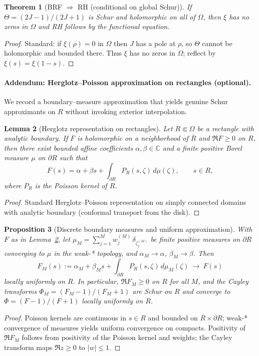 \documentclass[11pt]{article}
\newtheorem{theorem}{Theorem}
\newtheorem{proposition}[theorem]{Proposition}
\newtheorem{lemma}[theorem]{Lemma}
\theoremstyle{remark}
\newcommand{\C}{\mathbb{C}}
\begin{document}
\begin{theorem}[BRF \(\Rightarrow\) RH (conditional on global Schur)]\label{thm:brf-rh-final}
If \(\Theta=(2J-1)/(2J+1)\) is Schur and holomorphic on all of \(\Omega\), then \(\xi\) has no zeros in \(\Omega\) and RH follows by the functional equation.
\end{theorem}
\begin{proof}
Standard: if \(\xi(\rho)=0\) in \(\Omega\) then \(J\) has a pole at \(\rho\), so \(\Theta\) cannot be holomorphic and bounded there. Thus \(\xi\) has no zeros in \(\Omega\); reflect by \(\xi(s)=\xi(1-s)\).
\end{proof}

\paragraph{Addendum: Herglotz--Poisson approximation on rectangles (optional).}
We record a boundary--measure approximation that yields genuine Schur approximants on \(R\) without invoking exterior interpolation.

\begin{lemma}[Herglotz representation on rectangles]\label{lem:herglotz-rect}
Let \(R\Subset\Omega\) be a rectangle with analytic boundary. If \(F\) is holomorphic on a neighborhood of \(\overline R\) and \(\Re F\ge 0\) on \(R\), then there exist bounded affine coefficients \(\alpha,\beta\in\C\) and a finite positive Borel measure \(\mu\) on \(\partial R\) such that
\[F(s)=\alpha+\beta s+\int_{\partial R} P_R(s,\zeta)\,d\mu(\zeta),\qquad s\in R,\]
where \(P_R\) is the Poisson kernel of \(R\).
\end{lemma}
\begin{proof}
Standard Herglotz--Poisson representation on simply connected domains with analytic boundary (conformal transport from the disk).
\end{proof}

\begin{proposition}[Discrete boundary measures and uniform approximation]\label{prop:discrete-Poisson}
With \(F\) as in Lemma~\ref{lem:herglotz-rect}, let \(\mu_M=\sum_{j=1}^{M} w_j^{(M)}\,\delta_{\zeta_j^{(M)}}\) be finite positive measures on \(\partial R\) converging to \(\mu\) in the weak-* topology, and \(\alpha_M\to\alpha\), \(\beta_M\to\beta\). Then
\[F_M(s):=\alpha_M+\beta_M s+\int_{\partial R} P_R(s,\zeta)\,d\mu_M(\zeta)\ \to\ F(s)\]
locally uniformly on \(R\). In particular, \(\Re F_M\ge 0\) on \(R\) for all \(M\), and the Cayley transforms \(\Phi_M=(F_M-1)/(F_M+1)\) are Schur on \(R\) and converge to \(\Phi=(F-1)/(F+1)\) locally uniformly on \(R\).
\end{proposition}
\begin{proof}
Poisson kernels are continuous in \(s\in R\) and bounded on \(\overline R\times\partial R\); weak-* convergence of measures yields uniform convergence on compacts. Positivity of \(\Re F_M\) follows from positivity of the Poisson kernel and weights; the Cayley transform maps \(\Re z\ge 0\) to \(|w|\le 1\).
\end{proof}
\end{document}
